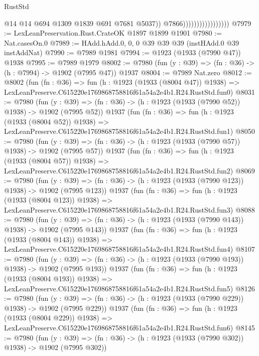 \begin{lexlean}{RustStd}
\begin{coremodule}
                                          @14
                                          @14
                                          @694
                                          @1309
                                          @1839
                                          @691
                                          @7681
                                          @5037))
                                      @7866)))))))))))))))))
@7979 := LexLeanPreservation.Rust.CrateOK @1897 @1899 @1901
@7980 := Nat.casesOn.{0}
@7989 := HAdd.hAdd.{0, 0, 0} @39 @39 @39 (instHAdd.{0} @39 instAddNat)
@7990 := @7989 @1981
@7994 := @1923 (@1933 (@7990 @47)) @1938
@7995 := @7989 @1979
@8002 := @7980 (fun (y : @39) => (fn : @36) -> (h : @7994) -> @1902 (@7995 @47)) @1937
@8004 := @7989 Nat.zero
@8012 := @8002
    (fun (fn : @36) =>
    fun (h : @1923 (@1933 (@8004 @47)) @1938) =>
    LexLeanPreserve.C615220e1769868758816f61a54a2e4b1.R24.RustStd.fun0)
@8031 := @7980
    (fun (y : @39) => (fn : @36) -> (h : @1923 (@1933 (@7990 @52)) @1938) -> @1902 (@7995 @52))
    @1937
    (fun (fn : @36) =>
    fun (h : @1923 (@1933 (@8004 @52)) @1938) =>
    LexLeanPreserve.C615220e1769868758816f61a54a2e4b1.R24.RustStd.fun1)
@8050 := @7980
    (fun (y : @39) => (fn : @36) -> (h : @1923 (@1933 (@7990 @57)) @1938) -> @1902 (@7995 @57))
    @1937
    (fun (fn : @36) =>
    fun (h : @1923 (@1933 (@8004 @57)) @1938) =>
    LexLeanPreserve.C615220e1769868758816f61a54a2e4b1.R24.RustStd.fun2)
@8069 := @7980
    (fun (y : @39) => (fn : @36) -> (h : @1923 (@1933 (@7990 @123)) @1938) -> @1902 (@7995 @123))
    @1937
    (fun (fn : @36) =>
    fun (h : @1923 (@1933 (@8004 @123)) @1938) =>
    LexLeanPreserve.C615220e1769868758816f61a54a2e4b1.R24.RustStd.fun3)
@8088 := @7980
    (fun (y : @39) => (fn : @36) -> (h : @1923 (@1933 (@7990 @143)) @1938) -> @1902 (@7995 @143))
    @1937
    (fun (fn : @36) =>
    fun (h : @1923 (@1933 (@8004 @143)) @1938) =>
    LexLeanPreserve.C615220e1769868758816f61a54a2e4b1.R24.RustStd.fun4)
@8107 := @7980
    (fun (y : @39) => (fn : @36) -> (h : @1923 (@1933 (@7990 @193)) @1938) -> @1902 (@7995 @193))
    @1937
    (fun (fn : @36) =>
    fun (h : @1923 (@1933 (@8004 @193)) @1938) =>
    LexLeanPreserve.C615220e1769868758816f61a54a2e4b1.R24.RustStd.fun5)
@8126 := @7980
    (fun (y : @39) => (fn : @36) -> (h : @1923 (@1933 (@7990 @229)) @1938) -> @1902 (@7995 @229))
    @1937
    (fun (fn : @36) =>
    fun (h : @1923 (@1933 (@8004 @229)) @1938) =>
    LexLeanPreserve.C615220e1769868758816f61a54a2e4b1.R24.RustStd.fun6)
@8145 := @7980
    (fun (y : @39) => (fn : @36) -> (h : @1923 (@1933 (@7990 @302)) @1938) -> @1902 (@7995 @302))

\end{coremodule}
\end{lexlean}
